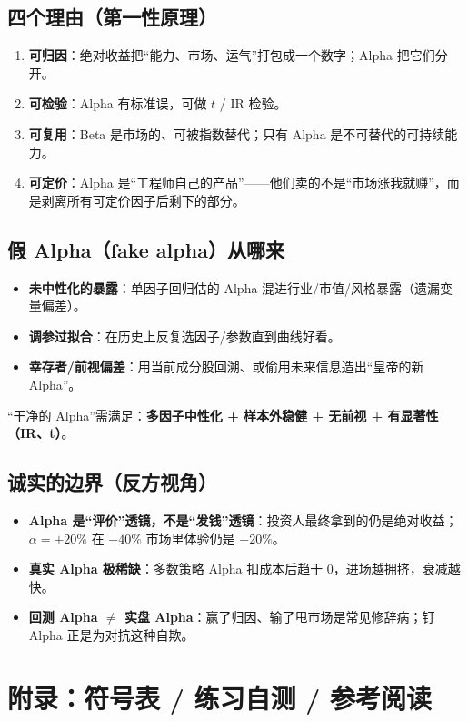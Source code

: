 \documentclass[UTF8,11pt]{ctexart}
\begin{document}
\subsection{四个理由（第一性原理）}
\begin{enumerate}[itemsep=2pt]
\item \textbf{可归因}：绝对收益把“能力、市场、运气”打包成一个数字；Alpha 把它们分开。
\item \textbf{可检验}：Alpha 有标准误，可做 $t$ / IR 检验。
\item \textbf{可复用}：Beta 是市场的、可被指数替代；只有 Alpha 是不可替代的可持续能力。
\item \textbf{可定价}：Alpha 是“工程师自己的产品”——他们卖的不是“市场涨我就赚”，而是剥离所有可定价因子后剩下的部分。
\end{enumerate}

\subsection{假 Alpha（fake alpha）从哪来}
\begin{itemize}[itemsep=2pt]
\item \textbf{未中性化的暴露}：单因子回归估的 Alpha 混进行业/市值/风格暴露（遗漏变量偏差）。
\item \textbf{调参过拟合}：在历史上反复选因子/参数直到曲线好看。
\item \textbf{幸存者/前视偏差}：用当前成分股回溯、或偷用未来信息造出“皇帝的新 Alpha”。
\end{itemize}
“干净的 Alpha”需满足：\textbf{多因子中性化 + 样本外稳健 + 无前视 + 有显著性（IR、t）}。

\subsection{诚实的边界（反方视角）}
\begin{itemize}[itemsep=2pt]
\item \textbf{Alpha 是“评价”透镜，不是“发钱”透镜}：投资人最终拿到的仍是绝对收益；$\alpha=+20\%$ 在 $-40\%$ 市场里体验仍是 $-20\%$。
\item \textbf{真实 Alpha 极稀缺}：多数策略 Alpha 扣成本后趋于 0，进场越拥挤，衰减越快。
\item \textbf{回测 Alpha $\neq$ 实盘 Alpha}：赢了归因、输了甩市场是常见修辞病；钉 Alpha 正是为对抗这种自欺。
\end{itemize}


\section*{附录：符号表 / 练习自测 / 参考阅读}
\end{document}
